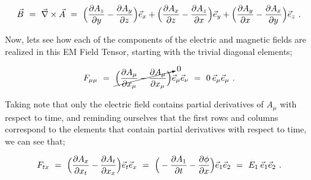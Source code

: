 \documentclass{article}
\begin{document}
\begin{equation} \label{eq:1002}
\vec{B} \hspace{0.125cm} = \hspace{0.125cm} \vec{\nabla} \times \vec{A} \hspace{0.125cm} = \hspace{0.125cm} \Big( \frac{\partial{A_z}}{\partial{y}} - \frac{\partial{A_y}}{\partial{z}} \Big) \vec{e}_x + \Big( \frac{\partial{A_x}}{\partial{z}} - \frac{\partial{A_z}}{\partial{x}} \Big) \vec{e}_y + \Big( \frac{\partial{A_y}}{\partial{x}} - \frac{\partial{A_x}}{\partial{y}} \Big) \vec{e}_z \hspace{0.125cm} .
\end{equation}

Now, lets see how each of the components of the electric and magnetic fields are realized in this EM Field Tensor, starting with the trivial diagonal elements;

\begin{equation} \label{eq:1002}
F_{\mu \mu} \hspace{0.125cm} = \hspace{0.125cm} \cancelto{0}{\Big( \frac{\partial{A_{\mu}}}{\partial{x_{\mu}}} - \frac{\partial{A_{\mu}}}{\partial{x_{\mu}}} \Big)} \vec{e}_{\mu} \vec{e}_{\nu} \hspace{0.125cm} = \hspace{0.125cm} 0 \hspace{0.075cm} \vec{e}_{\mu} \vec{e}_{\mu} \hspace{0.125cm} .
\end{equation}

Taking note that only the electric field contains partial derivatives of \begin{math} A_{\mu} \end{math} with respect to time, and reminding ourselves that the first rows and columns correspond to the elements that contain partial derivatives with respect to time, we can see that;

\begin{equation} \label{eq:1002}
F_{t x} \hspace{0.125cm} = \hspace{0.125cm}  \Big( \frac{\partial{A_{x}}}{\partial{x_{t}}} - \frac{\partial{A_{t}}}{\partial{x_{x}}} \Big) \vec{e}_{t} \vec{e}_{x} \hspace{0.125cm} = \hspace{0.125cm} \Big( - \frac{\partial{A_{1}}}{\partial{t}} - \frac{\partial{\phi}}{\partial{x}} \Big) \vec{e}_{1} \vec{e}_{2} \hspace{0.125cm} = \hspace{0.125cm} E_1 \hspace{0.075cm} \vec{e}_{1} \vec{e}_{2} \hspace{0.125cm} .
\end{equation}
\end{document}
